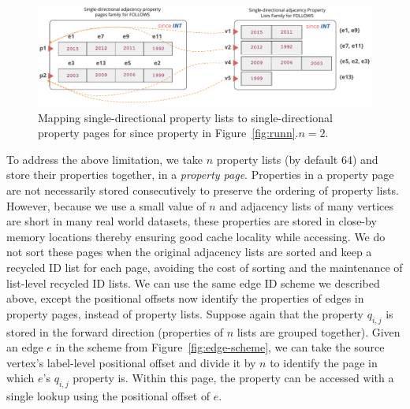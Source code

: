 \begin{figure}
	\hfill\includegraphics[scale=0.78]{img/paged}\hspace*{\fill}
	\captionsetup{justification=centering}
	\caption{Mapping single-directional property lists to single-directional property pages for since property in Figure~\ref{fig:runn}.$n=2$.}
	\label{fig:paged}
\end{figure}

 To address the above limitation, we take $n$ property lists (by default 64) and store their properties together, in a  \emph{property page}. Properties in a property page are not necessarily stored consecutively to preserve the ordering of property lists. However, because we use a small value of $n$ and adjacency lists of many vertices are short in many real world datasets, these properties are stored in close-by memory locations thereby ensuring good cache locality while accessing. We do not sort these pages when the original adjacency lists are sorted and keep a recycled ID list for each page, avoiding the cost of sorting and the maintenance of list-level recycled ID lists. We can use the same edge ID scheme we described above, except the positional offsets now identify the properties of edges in property pages, instead of property lists. Suppose again that the property $q_{i, j}$ is stored in the forward direction (properties of $n$ lists are grouped together). Given an edge $e$ in the scheme from Figure~\ref{fig:edge-scheme}, we can take the source vertex's label-level positional offset and divide it by $n$ to identify the page in which $e$'s $q_{i, j}$ property is. Within this page, the property can be accessed with a single lookup using the positional offset of $e$.


